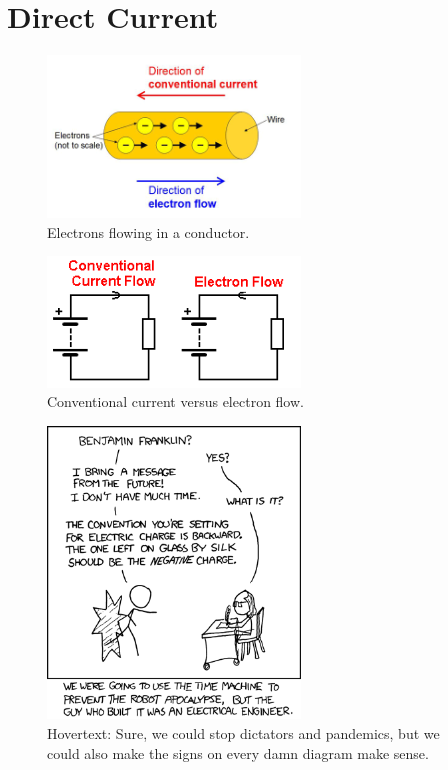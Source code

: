 \documentclass[a4paper]{amsbook}
\newcommand\capcite[1]{}
\begin{document}
\section{Direct Current}
\begin{figure}
  \centering
  \includegraphics[width=0.6\textwidth]{current1}
  \caption{Electrons flowing in a conductor. \capcite{https://www.sciencebuddies.org/Files/6631/7/wire-conventional-current.png}\label{fig:current1}}
\end{figure}
\begin{figure}
  \centering
  \includegraphics[width=0.6\textwidth]{current2}
  \caption{Conventional current versus electron flow. \capcite{http://www.talkingelectronics.com/projects/Diode\%20-\%20How\%20A\%20Diode\%20Works/images/CurrentFlow-2.gif}\label{fig:current2}}
\end{figure}
\begin{figure}
  \centering
  \includegraphics[width=0.6\textwidth]{current3}
  \caption{Hovertext: Sure, we could stop dictators and pandemics, but we could also make the signs on every damn diagram make sense. \capcite{https://xkcd.com/567/}\label{fig:current3}}
\end{figure}
\end{document}
